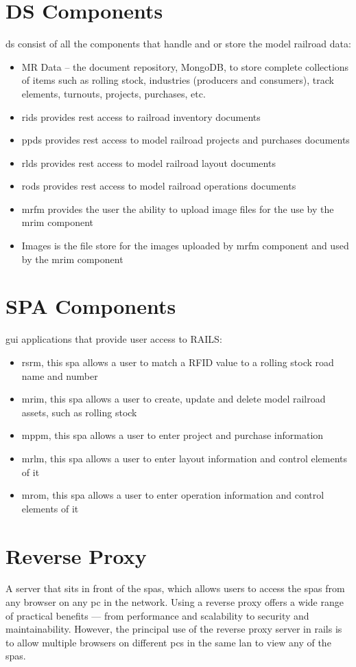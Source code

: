 \section{DS Components}
\gls{ds} consist of all the components that handle and or store the model railroad data:
\begin{itemize}
  \item MR Data – the document repository, MongoDB, to store complete collections of items such as rolling stock, industries (producers and consumers), track elements, turnouts, projects, purchases, etc.
  \item \gls{rids} provides \gls{rest} access to railroad inventory documents
  \item \gls{ppds} provides \gls{rest} access to model railroad projects and purchases documents
  \item \gls{rlds} provides \gls{rest} access to model railroad layout documents
  \item \gls{rods} provides \gls{rest} access to model railroad operations documents
  \item \gls{mrfm} provides the user the ability to upload image files for the use by the \gls{mrim} component
  \item Images is the file store for the images uploaded by \gls{mrfm} component and used by the \gls{mrim} component
\end{itemize}
\section{SPA Components}
\gls{gui} applications that provide user access to RAILS:
\begin{itemize}
  \item \gls{rsrm}, this \gls{spa} allows a user to match a RFID value to a rolling stock road name and number
  \item \gls{mrim}, this \gls{spa} allows a user to create, update and delete model railroad assets, such as rolling stock
  \item \gls{mppm}, this \gls{spa} allows a user to enter project and purchase information
  \item \gls{mrlm}, this \gls{spa} allows a user to enter layout information and control elements of it
  \item \gls{mrom}, this \gls{spa} allows a user to enter operation information and control elements of it
\end{itemize}
\section{Reverse Proxy}
A server that sits in front of the \glspl{spa}, which allows users to access the \glspl{spa} from any browser on any \gls{pc} in the network. Using a reverse proxy offers a wide range of practical benefits — from performance and scalability to security and maintainability. However, the principal use of the reverse proxy server in \gls{rails} is to allow multiple browsers on different \glspl{pc} in the same \gls{lan} to view any of the \glspl{spa}.

